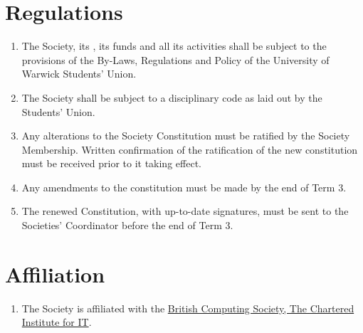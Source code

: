 \documentclass[a4paper,11pt,parskip=half-]{scrartcl} %
\begin{document}
\section{Regulations}
    \begin{enumerate}
        \item The Society, its \exec, its funds and all its activities shall be subject to the provisions of the By-Laws, Regulations and Policy of the University of Warwick Students' Union.

        \item The Society shall be subject to a disciplinary code as laid out by the Students' Union.

        \item Any alterations to the Society Constitution must be ratified by the Society Membership. Written confirmation of the ratification of the new constitution must be received prior to it taking effect.

        \item Any amendments to the constitution must be made by the end of Term 3.

        \item The renewed Constitution, with up-to-date signatures, must be sent to the Societies' Coordinator before the end of Term 3.
    \end{enumerate}

\section{Affiliation}
    \begin{enumerate}
        \item The Society is affiliated with the \href{https://www.bcs.org/membership-and-registrations/member-communities/student-chapters/}{British Computing Society, The Chartered Institute for IT}.
    \end{enumerate}
\end{document}
